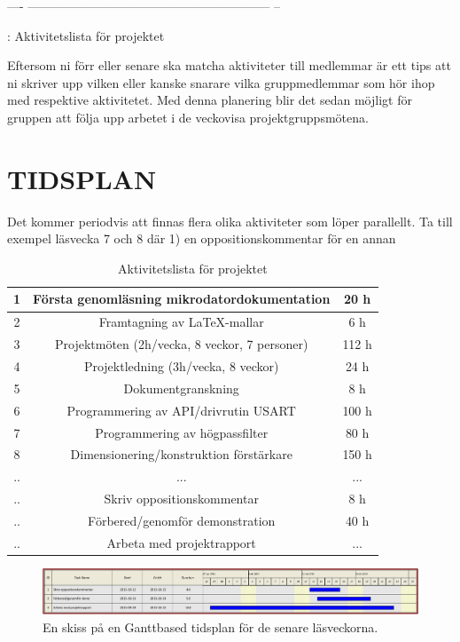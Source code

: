 \documentclass[a4paper]{article}
\begin{document}
  ---- ----------------------------------------------------------- --

  : Aktivitetslista för projektet

Eftersom ni förr eller senare ska matcha aktiviteter till medlemmar är
ett tips att ni skriver upp vilken eller kanske snarare vilka
gruppmedlemmar som hör ihop med respektive aktivitetet. Med denna
planering blir det sedan möjligt för gruppen att följa upp arbetet i de
veckovisa projektgruppsmötena.



\section{TIDSPLAN}


Det kommer periodvis att finnas flera olika aktiviteter som löper
parallellt. Ta till exempel läsvecka 7 och 8 där 1) en
oppositionskommentar för en annan

\begin{table}
\begin{center}
\begin{tabular}{ |c|c|c| } 
 \hline
 1 & Första genomläsning mikrodatordokumentation & 20 h\\ 
 \hline
 2 & Framtagning av LaTeX-mallar & 6 h \\ 
 \hline
 3 & Projektmöten (2h/vecka, 8 veckor, 7 personer)  & 112 h \\ 
 \hline
 4 & Projektledning (3h/vecka, 8 veckor) & 24 h \\ 
 \hline
 5 & Dokumentgranskning & 8 h \\
 \hline
 6 & Programmering av API/drivrutin USART & 100 h\\ 
 \hline
 7 & Programmering av högpassfilter & 80 h \\ 
 \hline
 8 & Dimensionering/konstruktion förstärkare & 150 h \\ 
 \hline
 .. & ... & ... \\ 
 \hline
 .. & Skriv oppositionskommentar & 8 h \\ 
 \hline
 .. & Förbered/genomför demonstration & 40 h \\
 \hline
 .. & Arbeta med projektrapport & ... \\ 
 \hline
\end{tabular}
\caption{Aktivitetslista för projektet}
\label{tabellnamnförreferens}
\end{center}
\end{table}

\begin{figure}
    \centering
    \includegraphics[width=\textwidth]{tidsplan.pdf}
    \caption{En skiss på en Ganttbased tidsplan för de senare läsveckorna.}
    \label{fig:my_label}
\end{figure}
\end{document}
